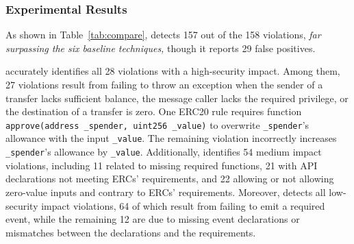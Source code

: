 



\subsubsection{Experimental Results}

As shown in Table~\ref{tab:compare}, \Tool{} detects 157 out of the 158 violations, 
\emph{far surpassing the six baseline techniques,} though it reports 29 false positives.

\italicparagraph{\Tool{}} 
accurately identifies all 28 violations with a high-security impact. 
Among them, 27 violations result from failing to throw an exception
when the sender of a transfer lacks sufficient balance, 
the message caller lacks the required privilege, 
or the destination of a transfer is zero. 
One ERC20 rule requires function \texttt{approve(address \_spender, uint256 \_value)} to overwrite \texttt{\_spender}'s allowance
with the input \texttt{\_value}.
The remaining violation incorrectly increases \texttt{\_spender}'s allowance by \texttt{\_value}.
Additionally, \Tool{} identifies 54 medium impact violations, 
including 11 related to missing required functions, 
21 with API declarations 
not meeting ERCs' requirements, 
and 22 allowing or not allowing zero-value inputs and contrary
to ERCs' requirements.
Moreover, \Tool{} detects all low-security impact violations, 
64 of which result from failing to emit a required event, 
while the remaining 12 are due to missing event declarations 
or mismatches between the declarations and the requirements. 




